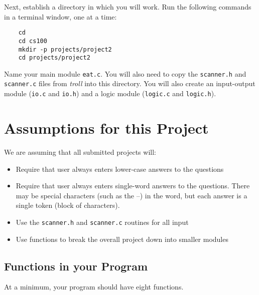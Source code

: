 \documentclass[12pt]{article}
\begin{document}
Next, establish a directory in which you will work.
Run the following commands in a terminal window, one at a time:

\begin{verbatim}
    cd
    cd cs100
    mkdir -p projects/project2
    cd projects/project2
\end{verbatim}

Name your main module {\tt eat.c}.  You will also need to copy the {\tt scanner.h} and
{\tt scanner.c} files from {\it troll} into this directory.
You will also
create an input-output module (\verb!io.c! and \verb!io.h!)
and a logic module (\verb!logic.c! and \verb!logic.h!).

\section*{Assumptions for this Project}

We are assuming that all submitted projects will:

\begin{itemize}
\item Require that user always enters lower-case answers to the questions
\item Require that user always enters single-word answers to the questions.  There
may be special characters (such as the --) in the word, but each answer is a
single token (block of characters).
\item Use the {\tt scanner.h} and {\tt scanner.c} routines for all input
\item Use functions to break the overall project down into smaller modules
\end{itemize}

\subsection*{Functions in your Program}

At a minimum, your program should have eight functions.
\end{document}

